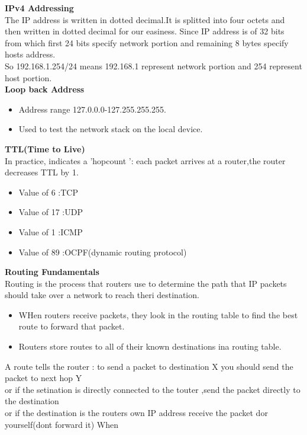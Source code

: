 \documentclass{report}
\begin{document}
	\textbf{IPv4 Addressing}\\ The IP address is written in dotted decimal.It is
	splitted into four octets and then written in dotted decimal for our easiness.
	Since IP address is of 32 bits from which first 24 bits specify network portion
	and remaining 8 bytes specify hosts address.\\ So 192.168.1.254/24 means 192.168.1
	represent network portion and 254 represent host portion.\\ \textbf{Loop back
	Address }
	\begin{itemize}
		\item Address range 127.0.0.0-127.255.255.255.

		\item Used to test the network stack on the local device.
	\end{itemize}
	\textbf{TTL(Time to Live)} \\ In practice, indicates a 'hopcount ': each packet
	arrives at a router,the router decreases TTL by 1.\\
	\begin{itemize}
		\item Value of 6 :TCP

		\item Value of 17 :UDP

		\item Value of 1 :ICMP

		\item Value of 89 :OCPF(dynamic routing protocol)
	\end{itemize}
	\textbf{Routing Fundamentals} \\ Routing is the process that routers use to determine
	the path that IP packets should take over a network to reach theri destination.
	\begin{itemize}
		\item WHen routers receive packets, they look in the routing table to find
			the best route to forward that packet.

		\item Routers store routes to all of their known destinations ina routing table.
	\end{itemize}
	A route tells the router : to send a packet to destination X you should send
	the packet to next hop Y \\ or if the setination is directly connected to the
	touter ,send the packet directly to the destination\\ or if the destination is
	the routers own IP address receive the packet dor yourself(dont forward it) When
\end{document}
